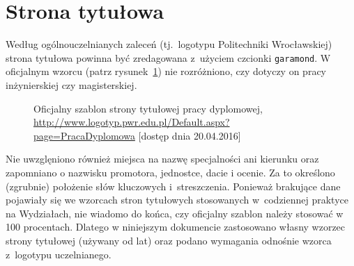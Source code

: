 \section{Strona tytułowa}
Według ogólnouczelnianych zaleceń (tj.\ logotypu Politechniki Wrocławskiej) strona tytułowa powinna być zredagowana z~użyciem czcionki \texttt{garamond}. W oficjalnym wzorcu (patrz rysunek~\ref{fig:stronaTytulowa})
nie rozróżniono, czy dotyczy on pracy inżynierskiej czy magisterskiej. 
\begin{figure}[b]
	\centering
	\caption{Oficjalny szablon strony tytułowej pracy dyplomowej, \url{http://www.logotyp.pwr.edu.pl/Default.aspx?page=PracaDyplomowa} [dostęp dnia 20.04.2016]}
	\label{fig:stronaTytulowa}
\end{figure}
Nie uwzglęniono również miejsca na nazwę specjalności ani kierunku oraz zapomniano o nazwisku promotora, jednostce, dacie i ocenie.  Za to określono (zgrubnie) położenie słów kluczowych i~streszczenia. Ponieważ brakujące dane pojawiały się we wzorcach stron tytułowych stosowanych w~codziennej praktyce na Wydziałach, nie wiadomo do końca, czy oficjalny szablon należy stosować w 100 procentach. Dlatego w niniejszym dokumencie zastosowano własny wzorzec strony tytułowej (używany od lat) oraz podano wymagania odnośnie wzorca z~logotypu uczelnianego.

